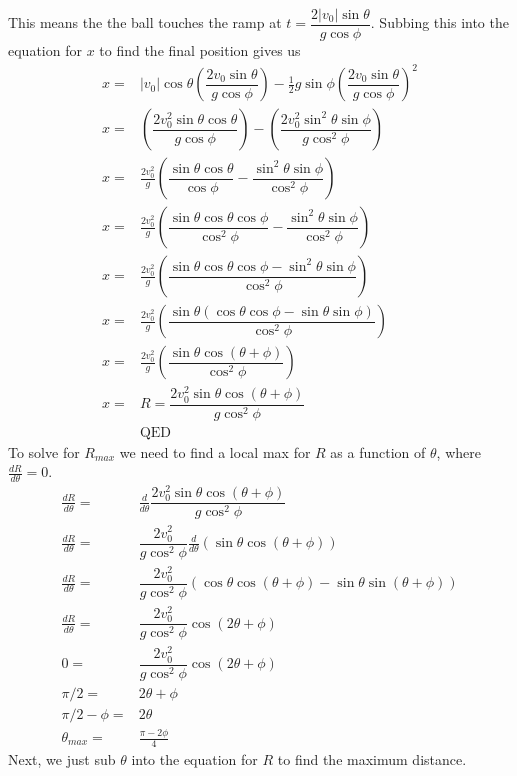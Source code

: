 \documentclass[12pt, a4paper]{article}
\begin{document}
This means the the ball touches the ramp at $t = \dfrac{2|v_0|\sin\theta}{g\cos\phi}$. Subbing this into the equation for $x$ to find the final position gives us
\begin{align*}
x =& |v_0|\cos\theta \left(\dfrac{2v_0\sin\theta}{g\cos\phi}\right) - \tfrac{1}{2}g\sin\phi \left(\dfrac{2v_0\sin\theta}{g\cos\phi}\right)^2
\\
x =&  \left(\dfrac{2v_0^2\sin\theta\cos\theta}{g\cos\phi}\right) -  \left(\dfrac{2v_0^2\sin^2\theta\sin\phi}{g\cos^2\phi}\right)
\\
x =&  \frac{2v_0^2}{g}\left(\dfrac{\sin\theta\cos\theta}{\cos\phi} -  \dfrac{\sin^2\theta\sin\phi}{\cos^2\phi}\right)
\\
x =&  \frac{2v_0^2}{g}\left(
\dfrac{\sin\theta\cos\theta\cos\phi}{\cos^2\phi} -  
\dfrac{\sin^2\theta\sin\phi}{\cos^2\phi}
\right)
\\
x =&  \frac{2v_0^2}{g}\left(
\dfrac{\sin\theta\cos\theta\cos\phi - \sin^2\theta\sin\phi}{\cos^2\phi}
\right)
\\
x =&  \frac{2v_0^2}{g}\left(
\dfrac{\sin\theta(\cos\theta\cos\phi - \sin\theta\sin\phi)}{\cos^2\phi}
\right)
\\
x =&  \frac{2v_0^2}{g}\left(
\dfrac{\sin\theta\cos(\theta+\phi)}{\cos^2\phi}
\right)
\\
x =& \boxed{R = \dfrac{2v_0^2\sin\theta\cos(\theta+\phi)}{g\cos^2\phi}}
\\
&\text{QED}
\end{align*}
To solve for $R_{max}$ we need to find a local max for $R$ as a function of $\theta$, where $\tfrac{dR}{d\theta}=0$.
\begin{align*}
\frac{dR}{d\theta} =& \frac{d}{d\theta}\dfrac{2v_0^2\sin\theta\cos(\theta+\phi)}{g\cos^2\phi}
\\
\frac{dR}{d\theta} =& \dfrac{2v_0^2}{g\cos^2\phi}\frac{d}{d\theta}\left(\sin\theta\cos(\theta+\phi)\right)
\\
\frac{dR}{d\theta} =& \dfrac{2v_0^2}{g\cos^2\phi}\left(
\cos\theta\cos(\theta+\phi) -
\sin\theta\sin(\theta+\phi)
\right)
\\
\frac{dR}{d\theta} =& \dfrac{2v_0^2}{g\cos^2\phi}\cos(2\theta+\phi)
\\
0 =& \dfrac{2v_0^2}{g\cos^2\phi}\cos(2\theta+\phi)
\\
\pi/2 =& 2\theta+\phi
\\
\pi/2 - \phi =& 2\theta
\\
\theta_{max} =& \frac{\pi-2\phi}{4}
\end{align*}
Next, we just sub $\theta$ into the equation for $R$ to find the maximum distance.
\end{document}
